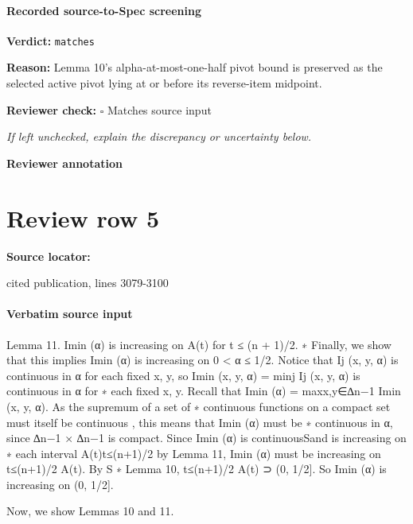 \documentclass[10pt]{article}
\newcommand{\reviewerbox}{%
  \par\noindent\fbox{\parbox{0.96\linewidth}{\rule{0pt}{0.38in}}}\par
}
\newcommand{\reviewmatch}[1]{%
  \par\noindent\textbf{Reviewer check:} $\square$\; #1\par
  \noindent\emph{If left unchecked, explain the discrepancy or uncertainty below.}\par
}
\begin{document}
\paragraph{Recorded source-to-Spec screening}
\textbf{Verdict:} \texttt{matches}
\\
{\raggedright
\textbf{Reason:} Lemma 10's alpha-\allowbreak{}at-\allowbreak{}most-\allowbreak{}one-\allowbreak{}half pivot bound is preserved as the selected active pivot lying at or before its reverse-\allowbreak{}item midpoint.\allowbreak{}
\par}
\reviewmatch{Matches source input}
\noindent\textbf{Reviewer annotation}\par
\reviewerbox
\clearpage
\hypertarget{source-claim-9a6a42e2321f37e9}{}
\section*{Review row 5}
\textbf{Source locator:} {\footnotesize\raggedright cited publication, lines 3079-\allowbreak{}3100\par}
\paragraph{Verbatim source input}
\begin{ReviewVerbatim}
Lemma 11. Imin
(α) is increasing on A(t) for t ≤ (n + 1)/2.
∗
Finally, we show that this implies Imin
(α) is increasing on 0 < α ≤ 1/2. Notice that Ij (x, y, α)
is continuous in α for each fixed x, y, so Imin (x, y, α) = minj Ij (x, y, α) is continuous in α for
∗
each fixed x, y. Recall that Imin
(α) = maxx,y∈∆n−1 Imin (x, y, α). As the supremum of a set of
∗
continuous functions on a compact set must itself be continuous , this means that Imin
(α) must be
∗
continuous in α, since ∆n−1 × ∆n−1 is compact. Since Imin (α) is continuousSand is increasing on
∗
each interval {A(t)}t≤(n+1)/2 by Lemma 11, Imin
(α) must be increasing on t≤(n+1)/2 A(t). By
S
∗
Lemma 10, t≤(n+1)/2 A(t) ⊃ (0, 1/2]. So Imin (α) is increasing on (0, 1/2].

Now, we show Lemmas 10 and 11.
\end{ReviewVerbatim}
\end{document}
